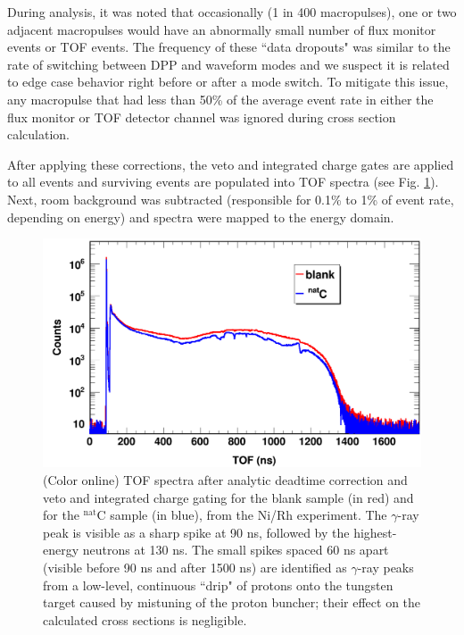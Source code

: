\documentclass[twocolumn,secnumarabic,amssymb, nobibnotes, aps, prl,
superscriptaddress, nobalancelastpage]{revtex4}
\begin{document}
During analysis, it was noted that occasionally (1 in 400 macropulses), one or two 
adjacent macropulses would have an abnormally small number of flux monitor events or 
TOF events. The frequency of these ``data dropouts" was similar to the rate of
switching between DPP and waveform modes and we suspect it is related to edge
case behavior right before or after a mode switch. To mitigate this issue,
any macropulse that had less than 50\% of the average event rate in either the
flux monitor or TOF detector channel was ignored during cross section calculation.

After applying these corrections, the veto and integrated charge gates are applied to 
all events and surviving events are populated into TOF spectra (see Fig.
\ref{ExampleTOFSpectrum}). Next, room background was subtracted (responsible for 0.1\% to 
1\% of event rate, depending on energy) and spectra were mapped to the energy domain.

\begin{figure}
    \includegraphics[scale=0.3]{figures/exampleTOFSpectrum.png}
    \caption{(Color online) TOF spectra after analytic deadtime correction and
        veto and integrated charge gating for the blank sample (in
        red) and for the $^{\text{nat}}$C sample (in blue), from the Ni/Rh experiment.
        The $\gamma$-ray peak is visible as a sharp spike at 90 ns, followed by
        the highest-energy neutrons at 130 ns. The small spikes spaced 60 ns
        apart (visible before 90 ns and after 1500
        ns) are identified as $\gamma$-ray peaks from a low-level, continuous ``drip" 
        of protons onto the tungsten target caused by mistuning of the proton 
        buncher; their effect on the calculated cross sections is negligible.
    }
    \label{ExampleTOFSpectrum}
\end{figure}
\end{document}
